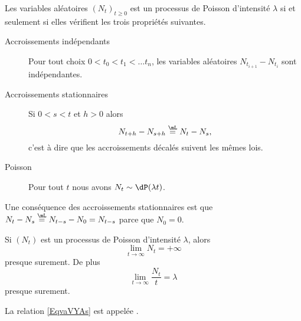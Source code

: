 \begin{theorem}
    Les variables aléatoires \( (N_t)_{t\geq 0}\) est un processus de Poisson d'intensité \( \lambda\) si et seulement si elles vérifient les trois propriétés suivantes.
    \begin{description}
        \item[Accroissements indépendants] Pour tout choix \( 0<t_0<t_1<\ldots t_n\), les variables aléatoires \( N_{t_{i+1}}-N_{t_i}\) sont indépendantes. 
        \item[Accroissements stationnaires] Si \( 0<s<t\) et \( h>0\) alors
            \begin{equation}
                N_{t+h}-N_{s+h}\stackrel{\mL}{=}N_t-N_s,
            \end{equation}
            c'est à dire que les accroissements décalés suivent les mêmes lois.
        \item[Poisson] Pour tout \( t\) nous avons \( N_t\sim\dP(\lambda t)\).
    \end{description}
\end{theorem}
Une conséquence des accroissements stationnaires est que \( N_t-N_s\stackrel{\mL}{=}N_{t-s}-N_0=N_{t-s}\) parce que \( N_0=0\).

\begin{proposition}
    Si \( (N_t)\) est un processus de Poisson d'intensité \( \lambda\), alors 
    \begin{equation}
        \lim_{t\to \infty} N_t=+\infty
    \end{equation}
    presque surement. De plus
    \begin{equation}        \label{EqvaVYAs}
        \lim_{t\to \infty} \frac{ N_t }{ t }=\lambda
    \end{equation}
    presque surement.
\end{proposition}
La relation \eqref{EqvaVYAs} est appelée .

